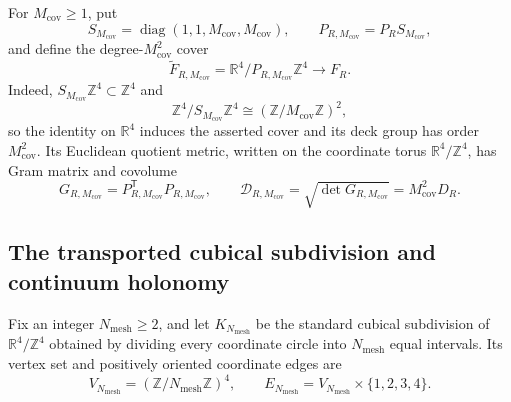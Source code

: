 For \(M_{\mathrm{cov}}\geq1\), put
\begin{equation}
 S_{M_{\mathrm{cov}}}
 =\operatorname{diag}(1,1,M_{\mathrm{cov}},M_{\mathrm{cov}}),
 \qquad
 P_{R,M_{\mathrm{cov}}}=P_RS_{M_{\mathrm{cov}}},
 \label{cusp-link-cover-matrix}
\end{equation}
and define the degree-\(M_{\mathrm{cov}}^2\) cover
\begin{equation}
 \widetilde F_{R,M_{\mathrm{cov}}}
 =\mathbb R^4/P_{R,M_{\mathrm{cov}}}\mathbb Z^4
 \longrightarrow F_R.
 \label{cusp-link-cover-torus}
\end{equation}
Indeed,
\(S_{M_{\mathrm{cov}}}\mathbb Z^4\subset\mathbb Z^4\) and
\[
 \mathbb Z^4/S_{M_{\mathrm{cov}}}\mathbb Z^4
 \cong(\mathbb Z/M_{\mathrm{cov}}\mathbb Z)^2,
\]
so the identity on \(\mathbb R^4\) induces the asserted cover and its deck
group has order \(M_{\mathrm{cov}}^2\).
Its Euclidean quotient metric, written on the coordinate torus
\(\mathbb R^4/\mathbb Z^4\), has Gram matrix and covolume
\begin{equation}
 G_{R,M_{\mathrm{cov}}}
 =P_{R,M_{\mathrm{cov}}}^{\mathsf T}P_{R,M_{\mathrm{cov}}},
 \qquad
 \mathcal D_{R,M_{\mathrm{cov}}}
 =\sqrt{\det G_{R,M_{\mathrm{cov}}}}
 =M_{\mathrm{cov}}^2D_R.
 \label{cusp-link-cover-metric}
\end{equation}

\subsection{The transported cubical subdivision and continuum holonomy}

Fix an integer \(N_{\mathrm{mesh}}\geq2\), and let
\(K_{N_{\mathrm{mesh}}}\) be the standard cubical subdivision of
\(\mathbb R^4/\mathbb Z^4\) obtained by dividing every coordinate circle
into \(N_{\mathrm{mesh}}\) equal intervals.  Its vertex set and positively
oriented coordinate edges are
\begin{equation}
 V_{N_{\mathrm{mesh}}}
 =(\mathbb Z/N_{\mathrm{mesh}}\mathbb Z)^4,
 \qquad
 E_{N_{\mathrm{mesh}}}
 =V_{N_{\mathrm{mesh}}}\times\{1,2,3,4\}.
 \label{cusp-link-cubical-sets}
\end{equation}

